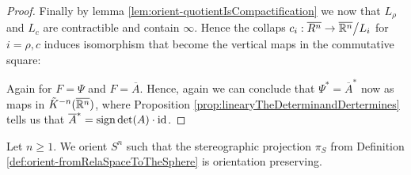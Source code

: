 \begin{proof}
     Finally by lemma \ref{lem:orient-quotientIsCompactification} we now that $L_\rho $ and $L_c$ are contractible and contain $\infty$. Hence the collaps $c_i: \overline{R^n}\to \overline{\mathbb{R}^n}\big/L_i$ for $i=\rho,c$  induces isomorphism that become the vertical maps in the commutative square:
    \begin{center}
    \end{center} Again for $F=\Psi$ and $F=\overline{A}$. Hence, again we can conclude that $\Psi^*=\overline{A}^*$ now as maps in $\tilde{K}^{-n}(\overline{\mathbb{R}^n})$, where Proposition \ref{prop:linearyTheDeterminandDertermines} tells us that $\overline{A}^*=\mathrm{sign} \det(A)\cdot \operatorname{\mathrm{id}}$.
\end{proof}
\begin{remark}\label{conv:orient-orientationOfTheSphere}
    Let $n\geq 1$. We orient $S^n$ such that the stereographic projection $\pi_S$ from Definition \ref{def:orient-fromRelaSpaceToTheSphere} is orientation preserving.
\end{remark}



